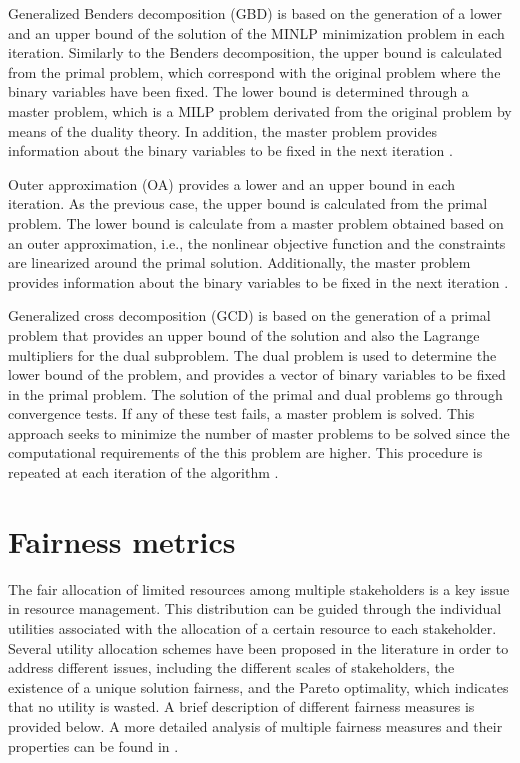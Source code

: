 \begin{refsection}[referencesCh1]
Generalized Benders decomposition (GBD) is based on the generation of a lower and an upper bound of the solution of the MINLP minimization problem in each iteration. Similarly to the Benders decomposition, the upper bound is calculated from the primal problem, which correspond with the original problem where the binary variables have been fixed. The lower bound is determined through a master problem, which is a MILP problem derivated from the original problem by means of the duality theory.  In addition, the master problem provides
information about the binary variables to be fixed in the next iteration \citep{Geoffrion1972237}.

Outer approximation (OA) provides a lower and an upper bound in each iteration. As the previous case, the upper bound is calculated from the primal problem. The lower bound is calculate from a master problem obtained based on an outer approximation, i.e., the nonlinear objective function and the constraints are linearized around the primal solution. Additionally, the master problem provides information about the binary variables to be fixed in the next iteration \citep{duran1986outer}.

Generalized cross decomposition (GCD) is based on the generation of a primal problem that provides an upper bound of the solution and also the Lagrange multipliers for the dual subproblem. The dual problem is used to determine the lower bound of the problem, and provides a vector of binary variables to be fixed in the primal problem. The solution of the primal and dual problems go through convergence tests. If any of these test fails, a master problem is solved. This approach seeks to minimize the number of master problems to be solved since the computational requirements of the this problem are higher. This procedure is repeated at each iteration of the algorithm \citep{holmberg1990convergence}.

\section{Fairness metrics}
The fair allocation of limited resources among multiple stakeholders is a key issue in resource management. This distribution can be guided
through the individual utilities associated with the allocation of a certain resource to each stakeholder. Several utility allocation schemes have been proposed in the literature in order to address different issues, including the different scales of stakeholders, the existence of a unique solution fairness, and the Pareto optimality, which indicates that no utility is wasted. A brief description of different fairness measures is provided below. A more detailed analysis of multiple fairness measures and their properties can be found in \citet{sampat2019fairness}.


\end{refsection}
